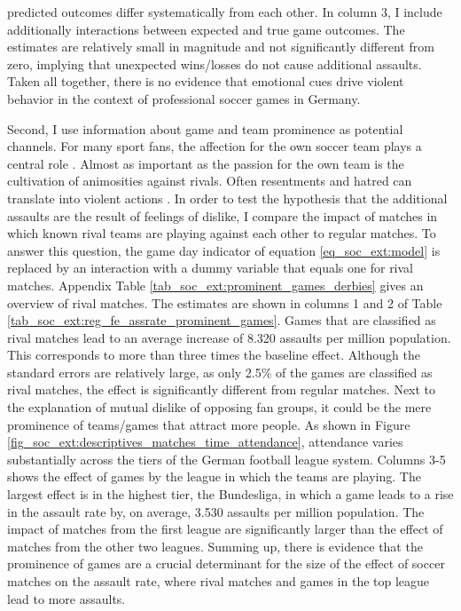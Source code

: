 \documentclass[11pt, a4paper]{article} %
\begin{document}
predicted outcomes differ systematically from each other. In column 3, I include additionally interactions between expected and true game outcomes. The estimates are relatively small in magnitude and not significantly different from zero, implying that unexpected wins/losses do not cause additional assaults. Taken all together, there is no evidence that emotional cues drive violent behavior in the context of professional soccer games in Germany.



Second, I use information about game and team prominence as potential channels. For many sport fans, the affection for the own soccer team plays a central role \citep{wann1993sports}. Almost as important as the passion for the own team is the cultivation of animosities against rivals. Often resentments and hatred can translate into violent actions \citep{nassauer2011hate}. In order to test the hypothesis that the additional assaults are the result of feelings of dislike, I compare the impact of matches in which known rival teams are playing against each other to regular matches. To answer this question, the game day indicator of equation \ref{eq_soc_ext:model} is replaced by an interaction with a dummy variable that equals one for rival matches. Appendix Table \ref{tab_soc_ext:prominent_games_derbies} gives an overview of rival matches. The estimates are shown in columns 1 and 2 of Table \ref{tab_soc_ext:reg_fe_assrate_prominent_games}. Games that are classified as rival matches lead to an average increase of 8.320 assaults per million population. This corresponds to more than three times the baseline effect. Although the standard errors are relatively large, as only 2.5\% of the games are classified as rival matches, the effect is significantly different from regular matches. Next to the explanation of mutual dislike of opposing fan groups, it could be the mere prominence of teams/games that attract more people. As shown in Figure \ref{fig_soc_ext:descriptives_matches_time_attendance}, attendance varies substantially across the tiers of the German football league system. Columns 3-5 shows the effect of games by the league in which the teams are playing. The largest effect is in the highest tier, the Bundesliga, in which a game leads to a rise in the assault rate by, on average, 3.530 assaults per million population. The impact of matches from the first league are significantly larger than the effect of matches from the other two leagues.  
Summing up, there is evidence that the prominence of games are a crucial determinant for the size of the effect of soccer matches on the assault rate, where rival matches and games in the top league lead to more assaults.
\end{document}

